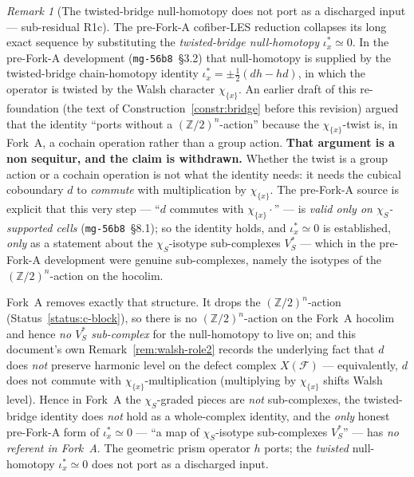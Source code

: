 \documentclass[11pt,oneside]{amsart}
\theoremstyle{plain}
\theoremstyle{definition}
\theoremstyle{remark}
\newtheorem{remark}[theorem]{Remark}
\theoremstyle{honeststyle}
\newcommand{\F}{\mathcal{F}}
\newcommand{\Z}{\mathbb{Z}}
\newcommand{\walsh}[1]{\chi_{#1}}
\begin{document}
\begin{remark}[The twisted-bridge null-homotopy does not port as a
discharged input --- sub-residual R1c]
\label{rem:bridge-not-ported}
The pre-Fork-A cofiber-LES reduction collapses its long exact sequence
by substituting the \emph{twisted-bridge null-homotopy}
$\iota_x^{*}\simeq0$. In the pre-Fork-A development
(\texttt{mg-56b8}~\S3.2) that null-homotopy is supplied by the
twisted-bridge chain-homotopy identity
$\iota_x^{*}=\pm\frac12(dh-hd)$, in which the operator is twisted by
the Walsh character $\walsh{\{x\}}$. An earlier draft of this
re-foundation (the text of Construction~\ref{constr:bridge} before
this revision) argued that the identity ``ports without a
$(\Z/2)^n$-action'' because the $\walsh{\{x\}}$-twist is, in Fork~A, a
cochain operation rather than a group action. \textbf{That argument is
a non sequitur, and the claim is withdrawn.} Whether the twist is a
group action or a cochain operation is not what the identity needs:
it needs the cubical coboundary $d$ to \emph{commute} with
multiplication by $\walsh{\{x\}}$. The pre-Fork-A source is explicit
that this very step --- ``$d$ commutes with $\walsh{\{x\}}\cdot$'' ---
is \emph{valid only on $\walsh{S}$-supported cells}
(\texttt{mg-56b8}~\S8.1); so the identity holds, and
$\iota_x^{*}\simeq0$ is established, \emph{only} as a statement about
the $\walsh{S}$-isotype sub-complexes $V_S^{*}$ --- which in the
pre-Fork-A development were genuine sub-complexes, namely the isotypes
of the $(\Z/2)^n$-action on the hocolim.

Fork~A removes exactly that structure. It drops the $(\Z/2)^n$-action
(Status~\ref{status:c-block}), so there is no $(\Z/2)^n$-action on the
Fork~A hocolim and hence \emph{no $V_S^{*}$ sub-complex} for the
null-homotopy to live on; and this document's own
Remark~\ref{rem:walsh-role2} records the underlying fact that $d$ does
\emph{not} preserve harmonic level on the defect complex $X(\F)$ ---
equivalently, $d$ does not commute with $\walsh{\{x\}}$-multiplication
(multiplying by $\walsh{\{x\}}$ shifts Walsh level). Hence in Fork~A
the $\walsh{S}$-graded pieces are \emph{not} sub-complexes, the
twisted-bridge identity does \emph{not} hold as a whole-complex
identity, and the \emph{only} honest pre-Fork-A form of
$\iota_x^{*}\simeq0$ --- ``a map of $\walsh{S}$-isotype sub-complexes
$V_S^{*}$'' --- has \emph{no referent in Fork~A}. The geometric prism
operator $h$ ports; the \emph{twisted} null-homotopy
$\iota_x^{*}\simeq0$ does not port as a discharged input.


\end{remark}
\end{document}
